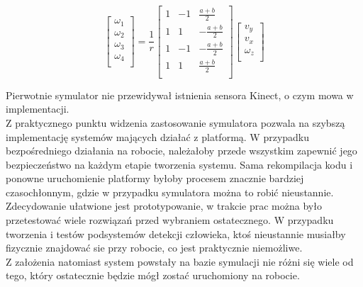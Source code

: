 \begin{figure}[H]
  	\centering 
	\begin{equation} \label{eq:kinematic_2}
	\begin{bmatrix}
	\omega_1 \\
	\omega_2 \\
	\omega_3 \\
	\omega_4 \\
	\end{bmatrix}
	=
	\frac{1}{r}
	\begin{bmatrix}
	1 & -1 & \frac{a+b}{2} \\
	1 & 1 & -\frac{a+b}{2} \\
	1 & -1 & -\frac{a+b}{2} \\
	1 & 1 & \frac{a+b}{2} \\
	\end{bmatrix}
	\begin{bmatrix}
	v_y \\
	v_x \\
	\omega_z \\
	\end{bmatrix}
	\end{equation}
\end{figure}

{\indent} Pierwotnie symulator nie przewidywał istnienia sensora Kinect, o czym mowa w implementacji. \\

{\indent} Z praktycznego punktu widzenia zastosowanie symulatora pozwala na szybszą implementację systemów mających działać z platformą. W przypadku bezpośredniego działania na robocie, należałoby przede wszystkim zapewnić jego bezpieczeństwo na każdym etapie tworzenia systemu. Sama rekompilacja kodu i ponowne uruchomienie platformy byłoby procesem znacznie bardziej czasochłonnym, gdzie w przypadku symulatora można to robić nieustannie. Zdecydowanie ułatwione jest prototypowanie, w trakcie prac można było przetestować wiele rozwiązań przed wybraniem ostatecznego. W przypadku tworzenia i testów podsystemów detekcji człowieka, ktoś nieustannie musiałby fizycznie znajdować sie przy robocie, co jest praktycznie niemożliwe. \\ 
{\indent}Z założenia natomiast system powstały na bazie symulacji nie różni się wiele od tego, który ostatecznie będzie mógł zostać uruchomiony na robocie. 